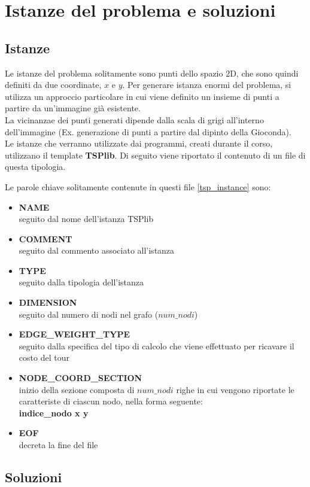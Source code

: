 \chapter{Istanze del problema e soluzioni}
\section{Istanze}
Le istanze del problema solitamente sono punti dello spazio 2D, che sono quindi definiti da due coordinate, $x$ e $y$.
Per generare istanza enormi del problema, si utilizza un approccio particolare in cui viene definito un insieme di punti a partire da un'immagine già esistente.\\
La vicinanzae dei punti generati dipende dalla scala di grigi all'interno dell'immagine (Ex. generazione di punti a partire dal dipinto della Gioconda\cite{monnalisa}).\\
Le istanze che verranno utilizzate dai programmi, creati durante il corso, utilizzano il template \textbf{TSPlib}. Di seguito viene riportato il contenuto di un file di questa tipologia.
 


Le parole chiave solitamente contenute in questi file \ref{tsp_instance} sono:
\begin{itemize}
\item{\textbf{NAME}\\
seguito dal nome dell'istanza TSPlib}
\item{\textbf{COMMENT}\\
seguito dal commento associato all'istanza}
\item{\textbf{TYPE}\\
seguito dalla tipologia dell'istanza}
\item{\textbf{DIMENSION}\\
seguito dal numero di nodi nel grafo ($num\_nodi$)}
\item{\textbf{EDGE\_WEIGHT\_TYPE}\\
seguito dalla specifica del tipo di calcolo che viene effettuato per ricavare il costo del tour}
\item{\textbf{NODE\_COORD\_SECTION}\\
inizio della sezione composta di $num\_nodi$ righe in cui vengono riportate le caratteriste di ciascun nodo, nella forma seguente:\\
\textbf{indice\_nodo  x  y}}
\item{\textbf{EOF}\\
decreta la fine del file}
\end{itemize}

\section{Soluzioni}

